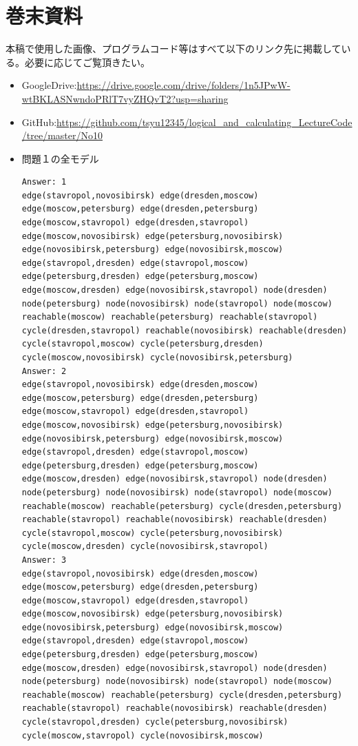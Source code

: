 \documentclass[dvipdfmx]{jsarticle}
\begin{document}
\section{巻末資料}
本稿で使用した画像、プログラムコード等はすべて以下のリンク先に掲載している。必要に応じてご覧頂きたい。
\begin{itemize}
  \item GoogleDrive:\url{https://drive.google.com/drive/folders/1n5JPwW-wtBKLASNwndoPRlT7vyZHQvT2?usp=sharing}
  \item GitHub:\url{https://github.com/tsyu12345/logical_and_calculating_LectureCode/tree/master/No10}
  \item 問題１の全モデル
  \begin{verbatim}
Answer: 1
edge(stavropol,novosibirsk) edge(dresden,moscow) edge(moscow,petersburg) edge(dresden,petersburg) edge(moscow,stavropol) edge(dresden,stavropol) edge(moscow,novosibirsk) edge(petersburg,novosibirsk) edge(novosibirsk,petersburg) edge(novosibirsk,moscow) edge(stavropol,dresden) edge(stavropol,moscow) edge(petersburg,dresden) edge(petersburg,moscow) edge(moscow,dresden) edge(novosibirsk,stavropol) node(dresden) node(petersburg) node(novosibirsk) node(stavropol) node(moscow) reachable(moscow) reachable(petersburg) reachable(stavropol) cycle(dresden,stavropol) reachable(novosibirsk) reachable(dresden) cycle(stavropol,moscow) cycle(petersburg,dresden) cycle(moscow,novosibirsk) cycle(novosibirsk,petersburg)
Answer: 2
edge(stavropol,novosibirsk) edge(dresden,moscow) edge(moscow,petersburg) edge(dresden,petersburg) edge(moscow,stavropol) edge(dresden,stavropol) edge(moscow,novosibirsk) edge(petersburg,novosibirsk) edge(novosibirsk,petersburg) edge(novosibirsk,moscow) edge(stavropol,dresden) edge(stavropol,moscow) edge(petersburg,dresden) edge(petersburg,moscow) edge(moscow,dresden) edge(novosibirsk,stavropol) node(dresden) node(petersburg) node(novosibirsk) node(stavropol) node(moscow) reachable(moscow) reachable(petersburg) cycle(dresden,petersburg) reachable(stavropol) reachable(novosibirsk) reachable(dresden) cycle(stavropol,moscow) cycle(petersburg,novosibirsk) cycle(moscow,dresden) cycle(novosibirsk,stavropol)
Answer: 3
edge(stavropol,novosibirsk) edge(dresden,moscow) edge(moscow,petersburg) edge(dresden,petersburg) edge(moscow,stavropol) edge(dresden,stavropol) edge(moscow,novosibirsk) edge(petersburg,novosibirsk) edge(novosibirsk,petersburg) edge(novosibirsk,moscow) edge(stavropol,dresden) edge(stavropol,moscow) edge(petersburg,dresden) edge(petersburg,moscow) edge(moscow,dresden) edge(novosibirsk,stavropol) node(dresden) node(petersburg) node(novosibirsk) node(stavropol) node(moscow) reachable(moscow) reachable(petersburg) cycle(dresden,petersburg) reachable(stavropol) reachable(novosibirsk) reachable(dresden) cycle(stavropol,dresden) cycle(petersburg,novosibirsk) cycle(moscow,stavropol) cycle(novosibirsk,moscow)

\end{verbatim}
\end{itemize}
\end{document}
